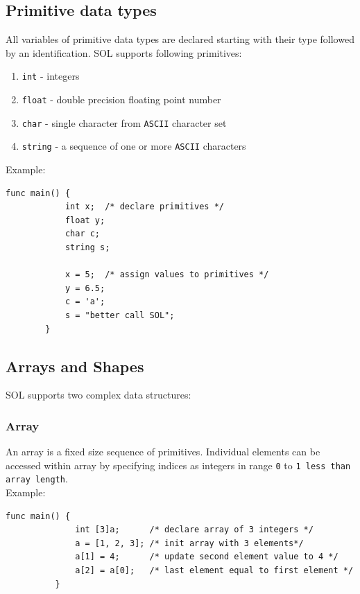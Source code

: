 \documentclass[letterpaper,12pt]{report}
\begin{document}
    \subsection{Primitive data types}
      All variables of primitive data types are declared starting with their type followed by an identification. SOL supports following primitives:
      \begin{enumerate}
        \itemsep 0em
        \item \texttt{int} - integers
        \item \texttt{float} - double precision floating point number
        \item \texttt{char} - single character from \texttt{ASCII} character set
        \item \texttt{string} - a sequence of one or more \texttt{ASCII} characters
      \end{enumerate}
      Example:\\
      \begin{lstlisting}[style=sol]
        func main() {
            int x;  /* declare primitives */
            float y;
            char c;
            string s;

            x = 5;  /* assign values to primitives */
            y = 6.5;
            c = 'a';
            s = "better call SOL";
        }
      \end{lstlisting}

    \subsection{Arrays and Shapes}
      SOL supports two complex data structures:
      \subsubsection{Array}
        An array is a fixed size sequence of primitives. Individual elements can be accessed within array by specifying indices as integers in range \texttt{0} to \texttt{1 less than array length}.\\
        Example:\\
        \begin{lstlisting}[style=sol]
          func main() {
              int [3]a;      /* declare array of 3 integers */
              a = [1, 2, 3]; /* init array with 3 elements*/
              a[1] = 4;      /* update second element value to 4 */
              a[2] = a[0];   /* last element equal to first element */
          }
        \end{lstlisting}
\end{document}
